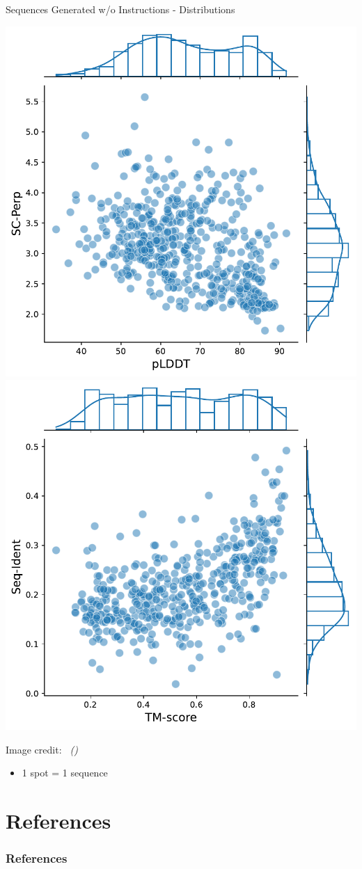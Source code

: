 \documentclass[dvipsnames,
hyperref={citecolor=blue}
]{beamer}
\newcommand{\credit}[2]{{\par\hfill \tiny #1 credit:~\itshape{\color{blue} \citeauthor{#2} (\citeyear{#2})}}}
\begin{document}
\begin{frame}{Sequences Generated w/o Instructions - Distributions}
	\begin{center}
		\includegraphics[scale=0.35]{images/plddt_scperp.pdf}
		\includegraphics[scale=0.35]{images/tm_sid.pdf}
	\end{center}
	\credit{Image}{lv2024prollama}
	\begin{itemize}
		\item 1 spot = 1 sequence
	\end{itemize}
\end{frame}

\section{References}
\begin{frame}[allowframebreaks]
\frametitle{References}
\printbibliography
\end{frame}
\end{document}
